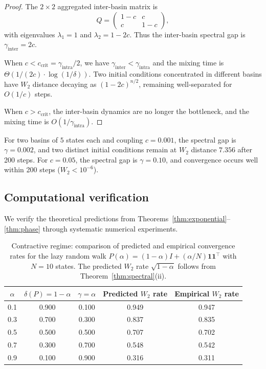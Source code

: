 \begin{proof}
The $2 \times 2$ aggregated inter-basin matrix is
\[
  Q = \begin{pmatrix} 1 - c & c \\ c & 1 - c \end{pmatrix},
\]
with eigenvalues $\lambda_1 = 1$ and $\lambda_2 = 1 - 2c$. Thus the
inter-basin spectral gap is $\gamma_{\mathrm{inter}} = 2c$.

When $c < c_{\mathrm{crit}} = \gamma_{\mathrm{intra}}/2$, we have
$\gamma_{\mathrm{inter}} < \gamma_{\mathrm{intra}}$ and the mixing time is
$\Theta(1/(2c) \cdot \log(1/\delta))$. Two initial conditions concentrated in
different basins have $W_2$ distance decaying as $(1 - 2c)^{n/2}$, remaining
well-separated for $O(1/c)$ steps.

When $c > c_{\mathrm{crit}}$, the inter-basin dynamics are no longer the
bottleneck, and the mixing time is $O(1/\gamma_{\mathrm{intra}})$.
\end{proof}

\begin{example}\label{ex:bistable}
For two basins of $5$ states each and coupling $c = 0.001$, the spectral gap is
$\gamma = 0.002$, and two distinct initial conditions remain at
$W_2$ distance $7.356$ after 200 steps. For $c = 0.05$, the spectral gap is
$\gamma = 0.10$, and convergence occurs well within 200 steps ($W_2 < 10^{-6}$).
\end{example}

\subsection{Computational verification}

We verify the theoretical predictions from Theorems~\ref{thm:exponential}--\ref{thm:phase}
through systematic numerical experiments.

\begin{table}[ht]
\centering
\caption{Contractive regime: comparison of predicted and empirical convergence
rates for the lazy random walk $P(\alpha) = (1-\alpha)I + (\alpha/N)\mathbf{1}\mathbf{1}^\top$
with $N = 10$ states. The predicted $W_2$ rate $\sqrt{1-\alpha}$ follows from
Theorem~\ref{thm:spectral}(ii).}\label{tab:contractive}
\begin{tabular}{@{}ccccc@{}}
\toprule
$\alpha$ & $\delta(P) = 1 - \alpha$ & $\gamma = \alpha$ &
Predicted $W_2$ rate & Empirical $W_2$ rate \\
\midrule
0.1 & 0.900 & 0.100 & 0.949 & 0.947 \\
0.3 & 0.700 & 0.300 & 0.837 & 0.835 \\
0.5 & 0.500 & 0.500 & 0.707 & 0.702 \\
0.7 & 0.300 & 0.700 & 0.548 & 0.542 \\
0.9 & 0.100 & 0.900 & 0.316 & 0.311 \\
\bottomrule
\end{tabular}
\end{table}

